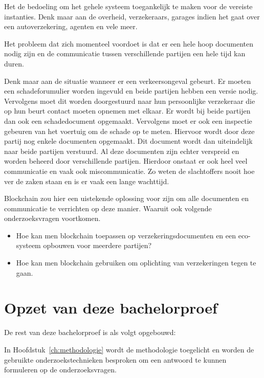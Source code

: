 Het de bedoeling om het gehele systeem toegankelijk te maken voor de vereiste instanties. Denk maar aan de overheid, verzekeraars, garages indien het gaat over een autoverzekering, agenten en vele meer. 

Het probleem dat zich momenteel voordoet is dat er een hele hoop documenten nodig zijn en de communicatie tussen verschillende partijen een hele tijd kan duren.

Denk maar aan de situatie wanneer er een verkeersongeval gebeurt. Er moeten een schadeforumulier worden ingevuld en beide partijen hebben een versie nodig. Vervolgens moet dit worden doorgestuurd naar hun persoonlijke verzekeraar die op hun beurt contact moeten opnemen met elkaar. Er wordt bij beide partijen dan ook een schadedocument opgemaakt. Vervolgens moet er ook een inspectie gebeuren van het voertuig om de schade op te meten. Hiervoor wordt door deze partij nog enkele documenten opgemaakt. Dit document wordt dan uiteindelijk naar beide partijen verstuurd. Al deze documenten zijn echter verspreid en worden beheerd door verschillende partijen. Hierdoor onstaat er ook heel veel communicatie en vaak ook miscommunicatie. Zo weten de slachtoffers nooit hoe ver de zaken staan en is er vaak een lange wachttijd. 

Blockchain zou hier een uistekende oplossing voor zijn om alle documenten en communicatie te verrichten op deze manier. Waaruit ook volgende onderzoeksvragen voortkomen.
\begin{itemize}
	\item Hoe kan men blockchain toepassen op verzekeringsdocumenten en een eco-systeem opbouwen voor meerdere partijen?
	\item Hoe kan men blockchain gebruiken om oplichting van verzekeringen tegen te gaan.
\end{itemize}

\section{Opzet van deze bachelorproef}
\label{sec:opzet-bachelorproef}


De rest van deze bachelorproef is als volgt opgebouwd:

In Hoofdstuk~\ref{ch:methodologie} wordt de methodologie toegelicht en worden de gebruikte onderzoekstechnieken besproken om een antwoord te kunnen formuleren op de onderzoeksvragen.

